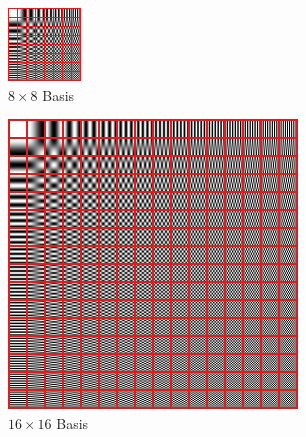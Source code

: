 \begin{figure}[htbp]
  \centering
  \begin{minipage}{0.48\textwidth}
    \centering
    \includegraphics[width=\linewidth]{figures/dct_basis_grid_8.png}\\[2mm]
    \small $8 \times 8$ Basis
  \end{minipage}\hfill
  \begin{minipage}{0.48\textwidth}
    \centering
    \includegraphics[width=\linewidth]{figures/dct_basis_grid_16.png}\\[2mm]
    \small $16 \times 16$ Basis
  \end{minipage}
\end{figure}

